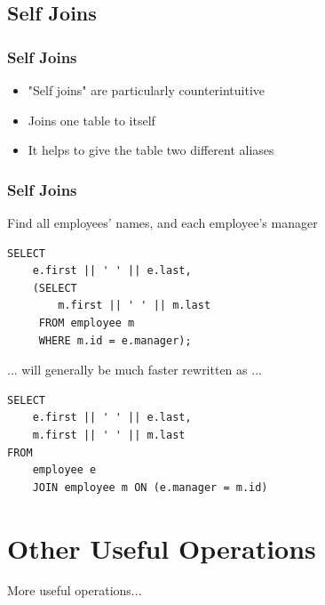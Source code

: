 \documentclass{beamer}
\begin{document}
\subsection{Self Joins}
\begin{frame}
    \frametitle{Self Joins}
    \begin{itemize}
        \item "Self joins" are particularly counterintuitive
        \pause
        \item Joins one table to itself
        \pause
        \item It helps to give the table two different aliases
    \end{itemize}
\end{frame}

\begin{frame}[fragile]
    \frametitle{Self Joins}
    Find all employees' names, and each employee's manager
    \begin{verbatim}
SELECT
    e.first || ' ' || e.last,
    (SELECT
        m.first || ' ' || m.last
     FROM employee m
     WHERE m.id = e.manager);
    \end{verbatim}
    ... will generally be much faster rewritten as ...
    \begin{verbatim}
SELECT
    e.first || ' ' || e.last,
    m.first || ' ' || m.last
FROM
    employee e
    JOIN employee m ON (e.manager = m.id)
    \end{verbatim}
\end{frame}

\section{Other Useful Operations}
\begin{frame}
    More useful operations...
\end{frame}
\end{document}
